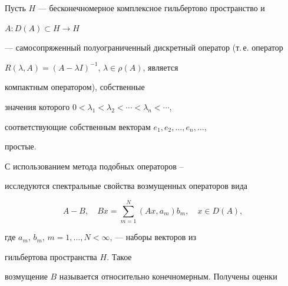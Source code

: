 




\pagestyle{plain} %













\maketitle













Пусть $H$ --- бесконечномерное комплексное гильбертово пространство и


$A:D(A)\subset H\to H$


--- самосопряженный полуограниченный дискретный оператор (т.\,е. оператор


$R(\lambda,A)=(A-\lambda I)^{-1}$, $\lambda\in\rho(A)$, является


компактным оператором), собственные


значения которого $0<\lambda_1<\lambda_2<\dotsb<\lambda_n<\dotsb$,


соответствующие собственным векторам $e_1,e_2,\dotsc,e_n,\dotsc$,


простые.





С использованием метода подобных операторов \cite{Bas1}--\cite{Dun}


исследуются спектральные свойства возмущенных операторов вида


\begin{equation}


A-B, \quad Bx=\sum^N_{m=1}(Ax,a_m)b_m,\quad x\in D(A),


\end{equation}


где $a_m$, $b_m$, $m=1,\dotsc,N<\infty$, --- наборы векторов из


гильбертова пространства $H$. Такое


возмущение $B$ называется относительно конечномерным. Получены оценки


